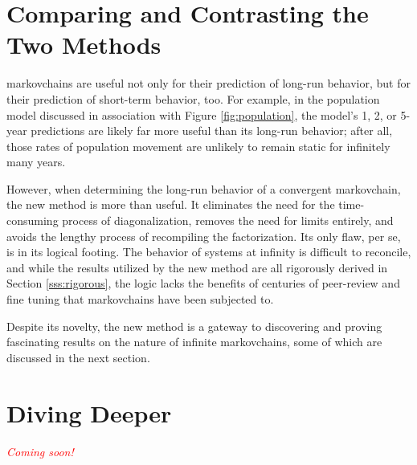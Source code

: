 \documentclass[titlepage]{article}
\begin{document}
\section{Comparing and Contrasting the Two Methods}
\Glspl{markovchain} are useful not only for their prediction of long-run behavior, but for their prediction of short-term behavior, too. For example, in the population model discussed in association with Figure \ref{fig:population}, the model's 1, 2, or 5-year predictions are likely far more useful than its long-run behavior; after all, those rates of population movement are unlikely to remain static for infinitely many years.\par
However, when determining the long-run behavior of a convergent \Gls{markovchain}, the new method is more than useful. It eliminates the need for the time-consuming process of diagonalization, removes the need for limits entirely, and avoids the lengthy process of recompiling the factorization. Its only flaw, per se, is in its logical footing. The behavior of systems at infinity is difficult to reconcile, and while the results utilized by the new method are all rigorously derived in Section \ref{sss:rigorous}, the logic lacks the benefits of centuries of peer-review and fine tuning that \Glspl{markovchain} have been subjected to.\par
Despite its novelty, the new method is a gateway to discovering and proving fascinating results on the nature of infinite \Glspl{markovchain}, some of which are discussed in the next section.
\newpage



\section{Diving Deeper}
\textcolor{red}{\textit{Coming soon!}}
\newpage



\printglossaries
\newpage





\end{document}

